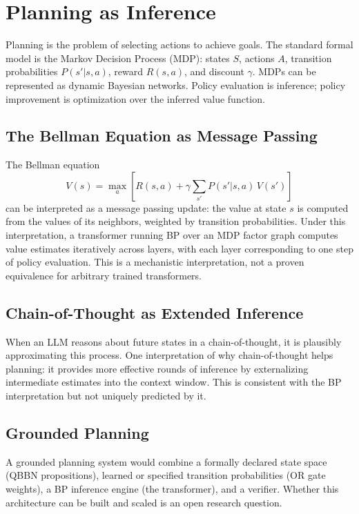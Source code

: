 \section{Planning as Inference}
\label{sec:planning}

Planning is the problem of selecting actions to achieve goals. The standard
formal model is the Markov Decision Process (MDP): states $S$, actions $A$,
transition probabilities $P(s' | s, a)$, reward $R(s,a)$, and discount
$\gamma$. MDPs can be represented as dynamic Bayesian networks. Policy
evaluation is inference; policy improvement is optimization over the
inferred value function.

\subsection*{The Bellman Equation as Message Passing}

The Bellman equation
\[
V(s) = \max_a \left[ R(s,a) + \gamma \sum_{s'} P(s'|s,a)\, V(s') \right]
\]
can be interpreted as a message passing update: the value at state $s$ is
computed from the values of its neighbors, weighted by transition
probabilities. Under this interpretation, a transformer running BP over
an MDP factor graph computes value estimates iteratively across layers,
with each layer corresponding to one step of policy evaluation. This is
a mechanistic interpretation, not a proven equivalence for arbitrary
trained transformers.

\subsection*{Chain-of-Thought as Extended Inference}

When an LLM reasons about future states in a chain-of-thought, it is
plausibly approximating this process. One interpretation of why
chain-of-thought helps planning: it provides more effective rounds of
inference by externalizing intermediate estimates into the context window.
This is consistent with the BP interpretation but not uniquely predicted
by it.

\subsection*{Grounded Planning}

A grounded planning system would combine a formally declared state space
(QBBN propositions), learned or specified transition probabilities (OR gate
weights), a BP inference engine (the transformer), and a verifier. Whether
this architecture can be built and scaled is an open research question.

